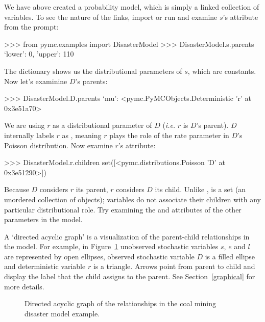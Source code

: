 \documentclass[]{jss}
\begin{document}
We have above created a  probability model, which is simply a linked collection of variables. To see the nature of the links, import or run  and examine $s$'s  attribute from the  prompt:
\begin{CodeInput}
>>> from pymc.examples import DisasterModel
>>> DisasterModel.s.parents
{`lower': 0, 'upper': 110}
\end{CodeInput}
The  dictionary shows us the distributional parameters of $s$, which are constants. Now let's examinine $D$'s parents:
\begin{CodeInput}
>>> DisasterModel.D.parents
{`mu': <pymc.PyMCObjects.Deterministic 'r' at 0x3e51a70>}
\end{CodeInput}
We are using $r$ as a distributional parameter of $D$ (\emph{i.e.} $r$ is $D$'s parent). $D$ internally labels $r$ as , meaning $r$ plays the role of the rate parameter in $D$'s Poisson distribution. Now examine $r$'s  attribute:
\begin{CodeInput}
>>> DisasterModel.r.children
set([<pymc.distributions.Poisson 'D' at 0x3e51290>])
\end{CodeInput}
Because $D$ considers $r$ its parent, $r$ considers $D$ its child. Unlike ,  is a set (an unordered collection of objects); variables do not associate their children with any particular distributional role. Try examining the  and  attributes of the other parameters in the model.

A `directed acyclic graph' is a visualization of the parent-child relationships in the model. For example, in Figure~\ref{fig:dag-example} unobserved stochastic variables $s$, $e$ and $l$ are represented by open ellipses, observed stochastic variable $D$ is a filled ellipse and deterministic variable $r$ is a triangle. Arrows point from parent to child and display the label that the child assigns to the parent. See Section~\ref{graphical} for more details.
\begin{figure}[h!]
\begin{center}
   \caption{Directed acyclic graph of the relationships in the coal mining disaster model example.}
	\label{fig:dag-example}
\end{center}
\end{figure}
\end{document}
